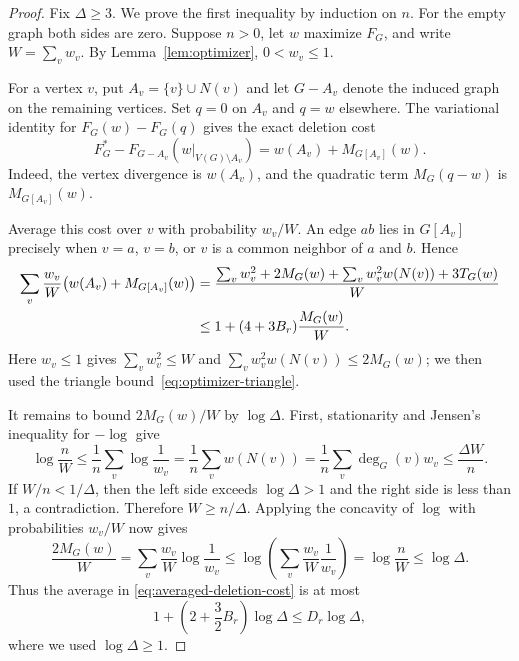 \documentclass[11pt]{article}
\theoremstyle{definition}
\theoremstyle{remark}
\numberwithin{equation}{section}
\begin{document}
\begin{proof}
Fix $\Delta\ge3$.  We prove the first inequality by induction on $n$.
For the empty graph both sides are zero.  Suppose $n>0$, let $w$ maximize
$F_G$, and write $W=\sum_v w_v$.  By Lemma~\ref{lem:optimizer},
$0<w_v\le1$.

For a vertex $v$, put $A_v=\{v\}\cup N(v)$ and let
$G-A_v$ denote the induced graph on the remaining vertices.
Set $q=0$ on $A_v$ and $q=w$ elsewhere.  The variational identity
for $F_G(w)-F_G(q)$ gives the exact deletion cost
\begin{equation}
 F_G^*-F_{G-A_v}(w|_{V(G)\setminus A_v})
 =w(A_v)+M_{G[A_v]}(w).
 \label{eq:closed-neighborhood-cost}
\end{equation}
Indeed, the vertex divergence is $w(A_v)$, and the quadratic term
$M_G(q-w)$ is $M_{G[A_v]}(w)$.

Average this cost over $v$ with probability $w_v/W$.
An edge $ab$ lies in $G[A_v]$ precisely when $v=a$, $v=b$, or
$v$ is a common neighbor of $a$ and $b$.  Hence
\begin{align}
 \sum_v\frac{w_v}{W}
       \bigl(w(A_v)+M_{G[A_v]}(w)\bigr)
 &=\frac{\sum_v w_v^2+2M_G(w)
       +\sum_v w_v^2w(N(v))+3T_G(w)}{W} \notag\\
 &\le 1+(4+3B_r)\frac{M_G(w)}{W}.
 \label{eq:averaged-deletion-cost}
\end{align}
Here $w_v\le1$ gives $\sum_vw_v^2\le W$ and
$\sum_vw_v^2w(N(v))\le2M_G(w)$; we then used the triangle
bound~\eqref{eq:optimizer-triangle}.

It remains to bound $2M_G(w)/W$ by $\log\Delta$. First, stationarity
and Jensen's inequality for $-\log$ give
\begin{equation}
 \log\frac{n}{W}
 \le \frac1n\sum_v\log\frac1{w_v}
 =\frac1n\sum_v w(N(v))
 =\frac1n\sum_v \deg_G(v)w_v
 \le \frac{\Delta W}{n}.
 \label{eq:optimizer-total-weight}
\end{equation}
If $W/n<1/\Delta$, then the left side exceeds $\log\Delta>1$
and the right side is less than $1$, a contradiction. Therefore
$W\ge n/\Delta$. Applying the concavity of $\log$ with probabilities
$w_v/W$ now gives
\begin{equation}
 \frac{2M_G(w)}{W}
 =\sum_v\frac{w_v}{W}\log\frac1{w_v}
 \le \log\left(\sum_v\frac{w_v}{W}\frac1{w_v}\right)
 =\log\frac{n}{W}
 \le\log\Delta.
 \label{eq:optimizer-edge-weight}
\end{equation}
Thus the average in \eqref{eq:averaged-deletion-cost} is at most
\[
 1+\left(2+\frac32B_r\right)\log\Delta
 \le D_r\log\Delta,
\]
where we used $\log\Delta\ge1$.


\end{proof}
\end{document}
